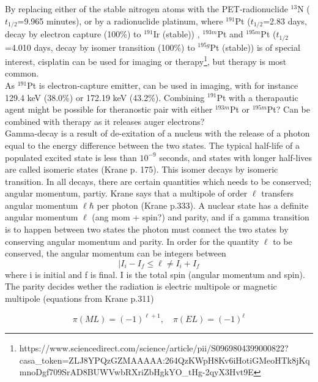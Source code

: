 By replacing either of the stable nitrogen atoms with the PET-radionuclide $^{13}$N ($t_{1/2}$=9.965 minutes), or by a radionuclide platinum, where $^{191}$Pt ($t_{1/2}$=2.83 days, decay by electron capture (100\%) to $^{191}$Ir (stable)) , $^{193m}$Pt and $^{195m}$Pt ($t_{1/2}$=4.010 days, decay by isomer transition (100\%) to $^{195g}$Pt (stable)) is of special interest, cisplatin can be used for imaging or therapy\footnote{https://www.sciencedirect.com/science/article/pii/S0969804399000822?casa_token=ZLJ8YPQzGZMAAAAA:264QzKWpH8Kv6iHotiGMeoHTk8jKqmnoDgf709SrAD8BUWVwbRXriZbHgkYO_tHg-2qyX3Hvt9E}, but therapy is most common. \\ 

\noindent 
As $^{191}$Pt is electron-capture emitter, can be used in imaging, with for instance 129.4 keV (38.0\%) or 172.19 keV (43.2\%). Combining $^{191}$Pt with a therapautic agent might be possible for theranostic pair with either $^{193m}$Pt or $^{195m}$Pt? Can be combined with therapy as it releases auger electrons? \\

Gamma-decay is a result of de-exitation of a nucleus with the release of a photon equal to the energy difference between the two states. The typical half-life of a populated excited state is less than $10^{-9}$ seconds, and states with longer half-lives are called isomeric states (Krane p. 175). This isomer decays by isomeric transition. In all decays, there are certain quantities which needs to be conserved; angular momentum, partiy. Krane says that a multipole of order $\ell$ transfers angular momentum $\ell \hbar$ per photon (Krane p.333). A nuclear state has a definite angular momentum $\ell$ (ang mom + spin?) and parity, and if a gamma transition is to happen between two states the photon must connect the two states by conserving angular momentum and parity. In order for the quantity $\ell$ to be conserved, the angular momentum can be integers between 
\begin{equation}
    |I_i - I_f \leq \ell \neq I_i + I_f
\end{equation}
where i is initial and f is final. I is the total spin (angular momentum and spin). The parity decides wether  the radiation is electric multipole or magnetic multipole (equations from Krane p.311)

\begin{equation}
\pi (ML)= (-1)^{\ell+1}, \quad \pi(EL) = (-1)^\ell    
\end{equation}

